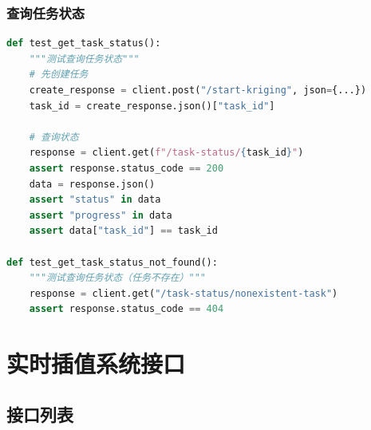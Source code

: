 \documentclass[12pt,a4paper,openany]{report}
\begin{document}
\subsubsection{查询任务状态}

\begin{lstlisting}[language=Python, caption=查询任务状态测试]
def test_get_task_status():
    """测试查询任务状态"""
    # 先创建任务
    create_response = client.post("/start-kriging", json={...})
    task_id = create_response.json()["task_id"]

    # 查询状态
    response = client.get(f"/task-status/{task_id}")
    assert response.status_code == 200
    data = response.json()
    assert "status" in data
    assert "progress" in data
    assert data["task_id"] == task_id

def test_get_task_status_not_found():
    """测试查询任务状态（任务不存在）"""
    response = client.get("/task-status/nonexistent-task")
    assert response.status_code == 404
\end{lstlisting}

\section{实时插值系统接口}

\subsection{接口列表}
\end{document}
